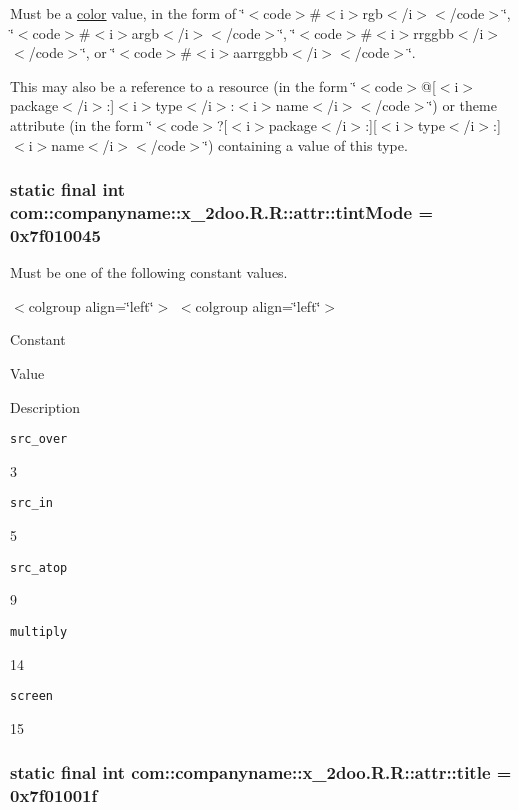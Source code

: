 Must be a \hyperlink{classcom_1_1companyname_1_1x__2doo_1_1_r_1_1color}{color} value, in the form of \char`\"{}$<$code$>$\#$<$i$>$rgb$<$/i$>$$<$/code$>$\char`\"{}, \char`\"{}$<$code$>$\#$<$i$>$argb$<$/i$>$$<$/code$>$\char`\"{}, \char`\"{}$<$code$>$\#$<$i$>$rrggbb$<$/i$>$$<$/code$>$\char`\"{}, or \char`\"{}$<$code$>$\#$<$i$>$aarrggbb$<$/i$>$$<$/code$>$\char`\"{}. 

This may also be a reference to a resource (in the form \char`\"{}$<$code$>$@\mbox{[}$<$i$>$package$<$/i$>$:\mbox{]}$<$i$>$type$<$/i$>$:$<$i$>$name$<$/i$>$$<$/code$>$\char`\"{}) or theme attribute (in the form \char`\"{}$<$code$>$?\mbox{[}$<$i$>$package$<$/i$>$:\mbox{]}\mbox{[}$<$i$>$type$<$/i$>$:\mbox{]}$<$i$>$name$<$/i$>$$<$/code$>$\char`\"{}) containing a value of this type. \hypertarget{classcom_1_1companyname_1_1x__2doo_1_1_r_1_1attr_868f3e42c76b8f45c9b87ae88a5741aa}{
\subsubsection[{tintMode}]{\setlength{\rightskip}{0pt plus 5cm}static final int com::companyname::x\_\-2doo.R.R::attr::tintMode = 0x7f010045}}
\label{classcom_1_1companyname_1_1x__2doo_1_1_r_1_1attr_868f3e42c76b8f45c9b87ae88a5741aa}


Must be one of the following constant values. \begin{TabularC}{0}
\hline
\end{TabularC}
$<$colgroup align=\char`\"{}left\char`\"{}$>$ $<$colgroup align=\char`\"{}left\char`\"{}$>$ 

Constant

Value

Description 

{\tt src\_\-over}

3

{\tt src\_\-in}

5

{\tt src\_\-atop}

9

{\tt multiply}

14

{\tt screen}

15\hypertarget{classcom_1_1companyname_1_1x__2doo_1_1_r_1_1attr_d23b9d3aaa28f1e83be97e20f187059b}{
\subsubsection[{title}]{\setlength{\rightskip}{0pt plus 5cm}static final int com::companyname::x\_\-2doo.R.R::attr::title = 0x7f01001f}}
\label{classcom_1_1companyname_1_1x__2doo_1_1_r_1_1attr_d23b9d3aaa28f1e83be97e20f187059b}


